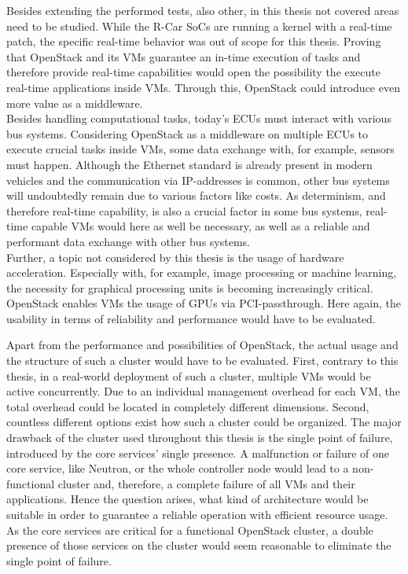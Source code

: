         \noindent Besides extending the performed tests, also other, in this thesis not covered areas need to be studied.
        While the R-Car \acp{SoC} are running a kernel with a real-time patch, the specific real-time behavior was out of scope for this thesis.
        Proving that OpenStack and its VMs guarantee  an in-time execution of tasks and therefore provide real-time capabilities would open the possibility the execute real-time applications inside VMs.
        Through this, OpenStack could introduce even more value as a middleware.\\
        Besides handling computational tasks, today's ECUs must interact with various bus systems.
        Considering OpenStack as a middleware on multiple ECUs to execute crucial tasks inside VMs, some data exchange with, for example, sensors must happen.
        Although the Ethernet standard is already present in modern vehicles and the communication via IP-addresses is common, other bus systems will undoubtedly remain due to various factors like costs.
        As determinism, and therefore real-time capability, is also a crucial factor in some bus systems, real-time capable VMs would here as well be necessary, as well as a reliable and performant data exchange with other bus systems.\\
        Further, a topic not considered by this thesis is the usage of hardware acceleration. 
        Especially with, for example, image processing or machine learning, the necessity for graphical processing units is becoming increasingly critical.
        OpenStack enables VMs the usage of GPUs via PCI-passthrough.
        Here again, the usability in terms of reliability and performance would have to be evaluated.
        
        \noindent Apart from the performance and possibilities of OpenStack, the actual usage and the structure of such a cluster would have to be evaluated.
        First, contrary to this thesis, in a real-world deployment of such a cluster, multiple \acp{VM} would be active concurrently.
        Due to an individual  management overhead for each \ac{VM}, the total overhead could be located in completely different dimensions.
        Second, countless different options exist how such a cluster could be organized.
        The major drawback of the cluster used throughout this thesis is the single point of failure, introduced by the core services' single presence.
        A malfunction or failure of one core service, like Neutron, or the whole controller node would lead to a non-functional cluster and, therefore, a complete failure of all \acp{VM} and their applications.
        Hence the question arises, what kind of architecture would be suitable in order to guarantee a reliable operation with efficient resource usage.
        As the core services are critical for a functional OpenStack cluster, a double presence of those services on the cluster would seem reasonable to eliminate the single point of failure.
                   
